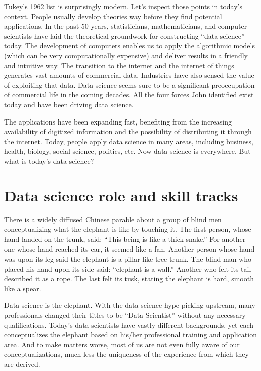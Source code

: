 \documentclass[
  12pt,
]{krantz}
\begin{document}
Tukey's 1962 list is surprisingly modern. Let's inspect those points in today's context. People usually develop theories way before they find potential applications. In the past 50 years, statisticians, mathematicians, and computer scientists have laid the theoretical groundwork for constructing ``data science'' today. The development of computers enables us to apply the algorithmic models (which can be very computationally expensive) and deliver results in a friendly and intuitive way. The transition to the internet and the internet of things generates vast amounts of commercial data. Industries have also sensed the value of exploiting that data. Data science seems sure to be a significant preoccupation of commercial life in the coming decades. All the four forces John identified exist today and have been driving data science.

The applications have been expanding fast, benefiting from the increasing availability of digitized information and the possibility of distributing it through the internet. Today, people apply data science in many areas, including business, health, biology, social science, politics, etc. Now data science is everywhere. But what is today's data science?

\hypertarget{data-science-role-and-skill-tracks}{%
\section{Data science role and skill tracks}\label{data-science-role-and-skill-tracks}}

There is a widely diffused Chinese parable about a group of blind men conceptualizing what the elephant is like by touching it. The first person, whose hand landed on the trunk, said: ``This being is like a thick snake.'' For another one whose hand reached its ear, it seemed like a fan. Another person whose hand was upon its leg said the elephant is a pillar-like tree trunk. The blind man who placed his hand upon its side said: ``elephant is a wall.'' Another who felt its tail described it as a rope. The last felt its tusk, stating the elephant is hard, smooth like a spear.

Data science is the elephant. With the data science hype picking upstream, many professionals changed their titles to be ``Data Scientist'' without any necessary qualifications. Today's data scientists have vastly different backgrounds, yet each conceptualizes the elephant based on his/her professional training and application area. And to make matters worse, most of us are not even fully aware of our conceptualizations, much less the uniqueness of the experience from which they are derived.
\end{document}
